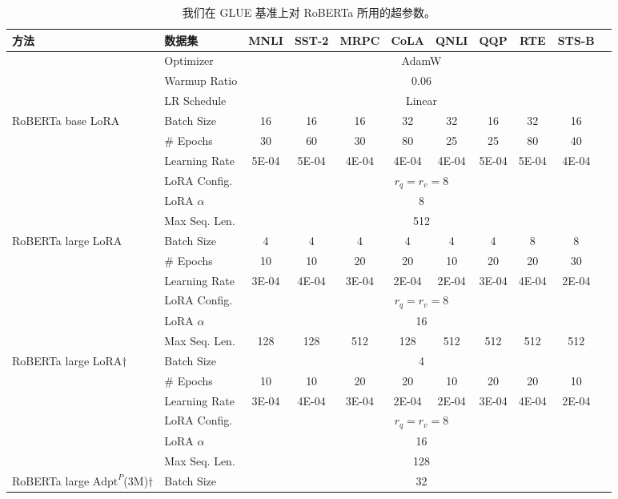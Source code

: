 \documentclass[11pt,UTF8,fontset=fandol]{ctexart}
\begin{document}
\begin{table}[H]\centering
\caption{我们在 GLUE 基准上对 RoBERTa 所用的超参数。}
\label{tab:9}
\small
\setlength{\tabcolsep}{4pt}
\begin{tabular}{llccccccccc}
\toprule
方法 & 数据集 & MNLI & SST-2 & MRPC & CoLA & QNLI & QQP & RTE & STS-B \\
\midrule
 & Optimizer & \multicolumn{8}{c}{AdamW} \\
 & Warmup Ratio & \multicolumn{8}{c}{0.06} \\
 & LR Schedule & \multicolumn{8}{c}{Linear} \\
\midrule
\multirow{5}{*}{RoBERTa base LoRA}
 & Batch Size & 16 & 16 & 16 & 32 & 32 & 16 & 32 & 16 \\
 & \# Epochs & 30 & 60 & 30 & 80 & 25 & 25 & 80 & 40 \\
 & Learning Rate & 5E-04 & 5E-04 & 4E-04 & 4E-04 & 4E-04 & 5E-04 & 5E-04 & 4E-04 \\
 & LoRA Config. & \multicolumn{8}{c}{$r_q=r_v=8$} \\
 & LoRA $\alpha$ & \multicolumn{8}{c}{8} \\
 & Max Seq. Len. & \multicolumn{8}{c}{512} \\
\midrule
\multirow{5}{*}{RoBERTa large LoRA}
 & Batch Size & 4 & 4 & 4 & 4 & 4 & 4 & 8 & 8 \\
 & \# Epochs & 10 & 10 & 20 & 20 & 10 & 20 & 20 & 30 \\
 & Learning Rate & 3E-04 & 4E-04 & 3E-04 & 2E-04 & 2E-04 & 3E-04 & 4E-04 & 2E-04 \\
 & LoRA Config. & \multicolumn{8}{c}{$r_q=r_v=8$} \\
 & LoRA $\alpha$ & \multicolumn{8}{c}{16} \\
 & Max Seq. Len. & 128 & 128 & 512 & 128 & 512 & 512 & 512 & 512 \\
\midrule
\multirow{5}{*}{RoBERTa large LoRA$\dagger$}
 & Batch Size & \multicolumn{8}{c}{4} \\
 & \# Epochs & 10 & 10 & 20 & 20 & 10 & 20 & 20 & 10 \\
 & Learning Rate & 3E-04 & 4E-04 & 3E-04 & 2E-04 & 2E-04 & 3E-04 & 4E-04 & 2E-04 \\
 & LoRA Config. & \multicolumn{8}{c}{$r_q=r_v=8$} \\
 & LoRA $\alpha$ & \multicolumn{8}{c}{16} \\
 & Max Seq. Len. & \multicolumn{8}{c}{128} \\
\midrule
\multirow{4}{*}{RoBERTa large $\text{Adpt}^P$(3M)$\dagger$}
 & Batch Size & \multicolumn{8}{c}{32} \\

\end{tabular}
\end{table}
\end{document}
